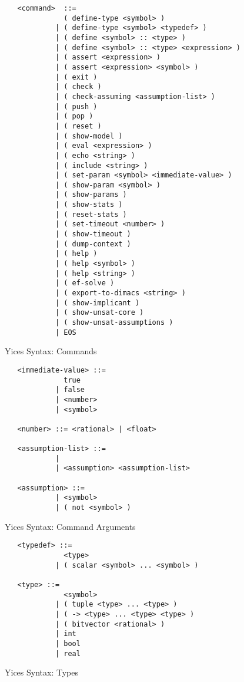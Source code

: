 \documentclass[11pt,twoside,fleqn,openright,titlepage]{cslreport}
\begin{document}
\begin{figure}
\begin{small}
\begin{verbatim}
   <command>  ::=
              ( define-type <symbol> )
            | ( define-type <symbol> <typedef> )
            | ( define <symbol> :: <type> )
            | ( define <symbol> :: <type> <expression> )
            | ( assert <expression> )
            | ( assert <expression> <symbol> )
            | ( exit )
            | ( check )
            | ( check-assuming <assumption-list> )
            | ( push )
            | ( pop )
            | ( reset )
            | ( show-model )
            | ( eval <expression> )
            | ( echo <string> )
            | ( include <string> )
            | ( set-param <symbol> <immediate-value> )
            | ( show-param <symbol> )
            | ( show-params )
            | ( show-stats )
            | ( reset-stats )
            | ( set-timeout <number> )
            | ( show-timeout )
            | ( dump-context )
            | ( help )
            | ( help <symbol> )
            | ( help <string> )
            | ( ef-solve )
            | ( export-to-dimacs <string> )
            | ( show-implicant )
            | ( show-unsat-core )
            | ( show-unsat-assumptions )
            | EOS

\end{verbatim}
\end{small}
\caption{Yices Syntax: Commands}
\label{syntax:commands}
\end{figure}

\begin{figure}
\begin{small}
\begin{verbatim}
   <immediate-value> ::=
              true
            | false
            | <number>
            | <symbol>

   <number> ::= <rational> | <float>

   <assumption-list> ::=
            |
            | <assumption> <assumption-list>

   <assumption> ::=
            | <symbol>
            | ( not <symbol> )

\end{verbatim}
\end{small}
\caption{Yices Syntax: Command Arguments}
\end{figure}

\begin{figure}
\begin{small}
\begin{verbatim}
   <typedef> ::=
              <type>
            | ( scalar <symbol> ... <symbol> )

   <type> ::=
              <symbol>
            | ( tuple <type> ... <type> )
            | ( -> <type> ... <type> <type> )
            | ( bitvector <rational> )
            | int
            | bool
            | real
\end{verbatim}
\end{small}
\caption{Yices Syntax: Types}
\label{syntax:types}
\end{figure}
\end{document}
